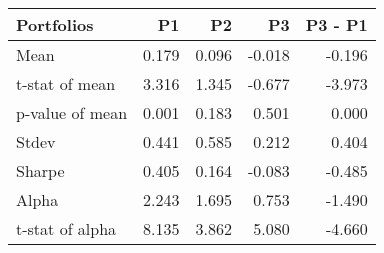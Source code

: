 \begin{tabular}{lrrrr}
\toprule
Portfolios & P1 & P2 & P3 & P3 - P1 \\
\midrule
Mean & 0.179 & 0.096 & -0.018 & -0.196 \\
t-stat of mean & 3.316 & 1.345 & -0.677 & -3.973 \\
p-value of mean & 0.001 & 0.183 & 0.501 & 0.000 \\
Stdev & 0.441 & 0.585 & 0.212 & 0.404 \\
Sharpe & 0.405 & 0.164 & -0.083 & -0.485 \\
Alpha & 2.243 & 1.695 & 0.753 & -1.490 \\
t-stat of alpha & 8.135 & 3.862 & 5.080 & -4.660 \\
\bottomrule
\end{tabular}
